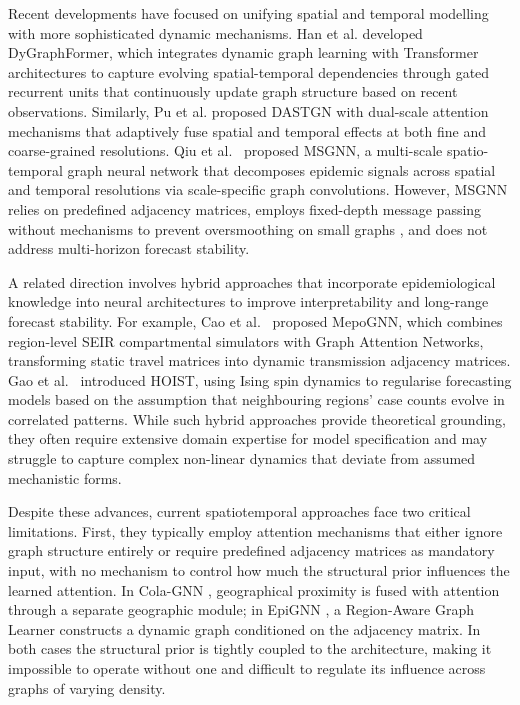 \documentclass[a4paper,fleqn]{cas-dc}
\begin{document}
Recent developments have focused on unifying spatial and temporal modelling with more sophisticated dynamic mechanisms. Han et al. \cite{han2025dygraphformer} developed DyGraphFormer, which integrates dynamic graph learning with Transformer architectures to capture evolving spatial-temporal dependencies through gated recurrent units that continuously update graph structure based on recent observations. Similarly, Pu et al. \cite{pu2024dynamic} proposed DASTGN with dual-scale attention mechanisms that adaptively fuse spatial and temporal effects at both fine and coarse-grained resolutions. Qiu et al.~\cite{Qiu2024MSGNN} proposed MSGNN, a multi-scale spatio-temporal graph neural network that decomposes epidemic signals across spatial and temporal resolutions via scale-specific graph convolutions. However, MSGNN relies on predefined adjacency matrices, employs fixed-depth message passing without mechanisms to prevent oversmoothing on small graphs \cite{li2018deeper}, and does not address multi-horizon forecast stability.

A related direction involves hybrid approaches that incorporate epidemiological knowledge into neural architectures to improve interpretability and long-range forecast stability. For example, Cao et al.~\cite{cao2022mepognn} proposed MepoGNN, which combines region-level SEIR compartmental simulators with Graph Attention Networks, transforming static travel matrices into dynamic transmission adjacency matrices. Gao et al.~\cite{gao2023evidence} introduced HOIST, using Ising spin dynamics to regularise forecasting models based on the assumption that neighbouring regions' case counts evolve in correlated patterns. While such hybrid approaches provide theoretical grounding, they often require extensive domain expertise for model specification and may struggle to capture complex non-linear dynamics that deviate from assumed mechanistic forms.

Despite these advances, current spatiotemporal approaches face two critical limitations. First, they typically employ attention mechanisms that either ignore graph structure entirely or require predefined adjacency matrices as mandatory input, with no mechanism to control how much the structural prior influences the learned attention. In Cola-GNN \cite{dengColaGNNCrosslocationAttention2020a}, geographical proximity is fused with attention through a separate geographic module; in EpiGNN \cite{xie2022epignn}, a Region-Aware Graph Learner constructs a dynamic graph conditioned on the adjacency matrix. In both cases the structural prior is tightly coupled to the architecture, making it impossible to operate without one and difficult to regulate its influence across graphs of varying density.
\end{document}
